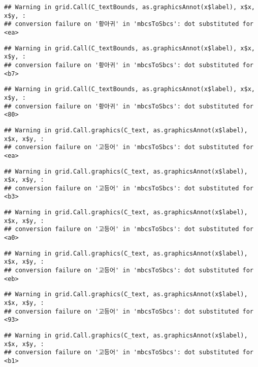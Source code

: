 \documentclass[
]{article}
\begin{document}
\begin{verbatim}
## Warning in grid.Call(C_textBounds, as.graphicsAnnot(x$label), x$x, x$y, :
## conversion failure on '황아귀' in 'mbcsToSbcs': dot substituted for <ea>
\end{verbatim}

\begin{verbatim}
## Warning in grid.Call(C_textBounds, as.graphicsAnnot(x$label), x$x, x$y, :
## conversion failure on '황아귀' in 'mbcsToSbcs': dot substituted for <b7>
\end{verbatim}

\begin{verbatim}
## Warning in grid.Call(C_textBounds, as.graphicsAnnot(x$label), x$x, x$y, :
## conversion failure on '황아귀' in 'mbcsToSbcs': dot substituted for <80>
\end{verbatim}

\begin{verbatim}
## Warning in grid.Call.graphics(C_text, as.graphicsAnnot(x$label), x$x, x$y, :
## conversion failure on '고등어' in 'mbcsToSbcs': dot substituted for <ea>
\end{verbatim}

\begin{verbatim}
## Warning in grid.Call.graphics(C_text, as.graphicsAnnot(x$label), x$x, x$y, :
## conversion failure on '고등어' in 'mbcsToSbcs': dot substituted for <b3>
\end{verbatim}

\begin{verbatim}
## Warning in grid.Call.graphics(C_text, as.graphicsAnnot(x$label), x$x, x$y, :
## conversion failure on '고등어' in 'mbcsToSbcs': dot substituted for <a0>
\end{verbatim}

\begin{verbatim}
## Warning in grid.Call.graphics(C_text, as.graphicsAnnot(x$label), x$x, x$y, :
## conversion failure on '고등어' in 'mbcsToSbcs': dot substituted for <eb>
\end{verbatim}

\begin{verbatim}
## Warning in grid.Call.graphics(C_text, as.graphicsAnnot(x$label), x$x, x$y, :
## conversion failure on '고등어' in 'mbcsToSbcs': dot substituted for <93>
\end{verbatim}

\begin{verbatim}
## Warning in grid.Call.graphics(C_text, as.graphicsAnnot(x$label), x$x, x$y, :
## conversion failure on '고등어' in 'mbcsToSbcs': dot substituted for <b1>
\end{verbatim}
\end{document}
